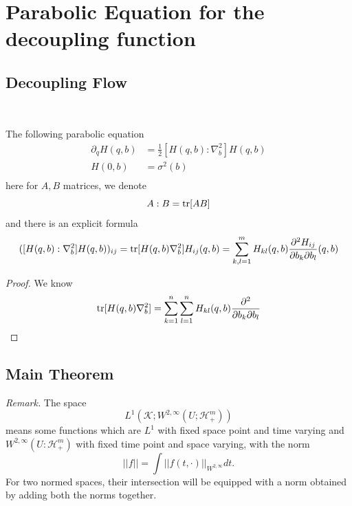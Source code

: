 \section{Parabolic Equation for the decoupling function}

\subsection{Decoupling Flow}

\begin{definition}\ \par
    The following parabolic equation
    \[
    \begin{aligned}
        \partial_q H(q,b) &= \tfrac{1}{2}[H(q,b):\nabla_b^2]H(q,b) \\
        H(0,b) &= \sigma^2(b) \\
    \end{aligned}
    \]
    here for $A,B$ matrices, we denote
    \[
    A:B = \text{tr}[AB]
    \]
    and there is an explicit formula
    \[
    ([H(q,b):\nabla_b^2]H(q,b))_{ij} = \text{tr}[H(q,b)\nabla^2_b]H_{ij}(q,b) = \sum\limits_{k,l = 1}^{m}H_{kl}(q,b) \dfrac{\partial^2 H_{ij}}{\partial b_k\partial b_l}(q,b)
    \]\label{paraeq}
\end{definition}
\begin{proof}
    We know
    \[
    \text{tr}[H(q,b)\nabla^2_b] = \sum\limits_{k=1}^n \sum\limits_{l=1}^n H_{kl}(q,b)\dfrac{\partial^2}{\partial b_k \partial b_l}
    \]
\end{proof}

\subsection{Main Theorem}

\emph{Remark.} The space
    \[
    L^1(\mathcal{K};W^{2,\infty}(U;\mathcal{H}_+^m))
    \]
means some functions which are $L^1$ with fixed space point and time varying and $W^{2,\infty}(U:\mathcal{H}_+^m)$ with fixed time point and space varying, with the norm
\[||f|| = \int ||f(t,\cdot)||_{W^{2,\infty}}dt.\]
For two normed spaces, their intersection will be equipped with a norm obtained by adding both the norms together.

